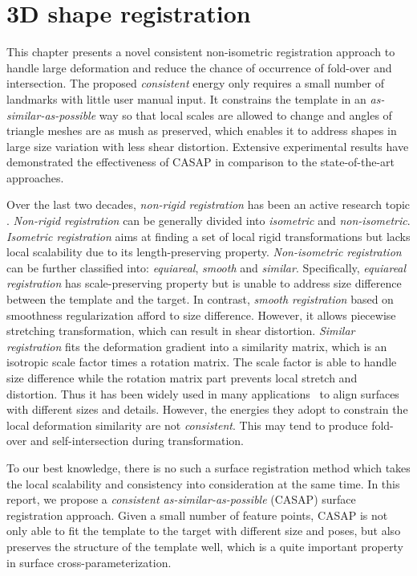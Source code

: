 \ifx\isEmbedded\undefined



\fi
\chapter{3D shape registration}
\label{chap:mesh}
This chapter presents a novel consistent non-isometric registration approach to handle large deformation and reduce the chance of occurrence of fold-over and intersection. The proposed \emph{consistent} energy only requires a small number of landmarks with little user manual input. It constrains the template in an \textit{as-similar-as-possible} way so that local scales are allowed to change and angles of triangle meshes are as mush as preserved, which enables it to address shapes in large size variation with less shear distortion. Extensive experimental results have demonstrated the effectiveness of CASAP in comparison to the state-of-the-art approaches.

Over the last two decades, \emph{non-rigid registration} has been an active research topic \citep{van2011survey}. \emph{Non-rigid registration} can be generally divided into \emph{isometric} and \emph{non-isometric}. \emph{Isometric registration} aims at finding a set of local rigid transformations but lacks local scalability due to its length-preserving property. \emph{Non-isometric registration} can be further classified into: \emph{equiareal}, \emph{smooth} and \emph{similar}. Specifically, \emph{equiareal registration} has scale-preserving property but is unable to address size difference between the template and the target. In contrast, \emph{smooth registration} based on smoothness regularization afford to size difference. However, it allows piecewise stretching transformation, which can result in shear distortion. \emph{Similar registration} fits the deformation gradient into a similarity matrix, which is an isotropic scale factor times a rotation matrix. The scale factor is able to handle size difference while the rotation matrix part prevents local stretch and distortion. Thus it has been widely used in many applications~\citep{yamazaki2013non,yoshiyasu2014conformal,papazov2011deformable} to align surfaces with different sizes and details. However, the energies they adopt to constrain the local deformation similarity are not \emph{consistent}. This may tend to produce fold-over and self-intersection during transformation.

To our best knowledge, there is no such a surface registration method which takes the local scalability and consistency into consideration at the same time. In this report, we propose a \emph{consistent as-similar-as-possible} (CASAP) surface registration approach. Given a small number of feature points, CASAP is not only able to fit the template to the target with different size and poses, but also preserves the structure of the template well, which is a quite important property in surface cross-parameterization.


